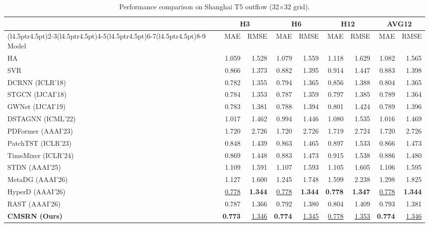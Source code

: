 \begin{table}[!t]
\centering
\caption{Performance comparison on Shanghai T5 outflow (32$\times$32 grid).}
\label{tab:shanghai-outflow}
\begingroup
\fontsize{9}{11}\selectfont
\setlength{\tabcolsep}{4.5pt}
\renewcommand{\arraystretch}{1.12}
\begin{tabular*}{\linewidth}{@{\extracolsep{\fill}}l*{8}{r}@{}}
\toprule
& \multicolumn{2}{c}{H3} & \multicolumn{2}{c}{H6} & \multicolumn{2}{c}{H12} & \multicolumn{2}{c}{AVG12} \\
\cmidrule(l{4.5pt}r{4.5pt}){2-3}\cmidrule(l{4.5pt}r{4.5pt}){4-5}\cmidrule(l{4.5pt}r{4.5pt}){6-7}\cmidrule(l{4.5pt}r{4.5pt}){8-9}
Model & MAE & RMSE & MAE & RMSE & MAE & RMSE & MAE & RMSE \\
\midrule
HA & 1.059 & 1.528 & 1.079 & 1.559 & 1.118 & 1.629 & 1.082 & 1.565 \\
SVR & 0.866 & 1.373 & 0.882 & 1.395 & 0.914 & 1.447 & 0.883 & 1.398 \\
DCRNN (ICLR'18) & 0.782 & 1.355 & 0.794 & 1.365 & 0.856 & 1.388 & 0.804 & 1.365 \\
STGCN (IJCAI'18) & 0.784 & 1.353 & 0.787 & 1.359 & 0.797 & 1.385 & 0.789 & 1.364 \\
GWNet (IJCAI'19) & 0.783 & 1.381 & 0.788 & 1.394 & 0.801 & 1.424 & 0.789 & 1.396 \\
DSTAGNN (ICML'22) & 1.017 & 1.462 & 0.994 & 1.446 & 1.080 & 1.535 & 1.016 & 1.469 \\
PDFormer (AAAI'23) & 1.720 & 2.726 & 1.720 & 2.726 & 1.719 & 2.724 & 1.720 & 2.726 \\
PatchTST (ICLR'23) & 0.848 & 1.439 & 0.863 & 1.465 & 0.897 & 1.533 & 0.866 & 1.473 \\
TimeMixer (ICLR'24) & 0.869 & 1.448 & 0.883 & 1.473 & 0.915 & 1.538 & 0.886 & 1.480 \\
STDN (AAAI'25) & 1.109 & 1.591 & 1.107 & 1.593 & 1.105 & 1.605 & 1.106 & 1.595 \\
MetaDG (AAAI'26) & 1.127 & 1.600 & 1.245 & 1.748 & 1.599 & 2.238 & 1.298 & 1.825 \\
HyperD (AAAI'26) & \underline{0.778} & \textbf{1.344} & \underline{0.778} & \textbf{1.344} & \textbf{0.778} & \textbf{1.347} & \underline{0.778} & \textbf{1.344} \\
RAST (AAAI'26) & 0.787 & 1.366 & 0.792 & 1.380 & 0.804 & 1.409 & 0.793 & 1.381 \\
\midrule
\textbf{CMSRN (Ours)} & \textbf{0.773} & \underline{1.346} & \textbf{0.774} & \underline{1.345} & \underline{0.778} & \underline{1.353} & \textbf{0.774} & \underline{1.346} \\
\bottomrule
\end{tabular*}
\endgroup
\end{table}
